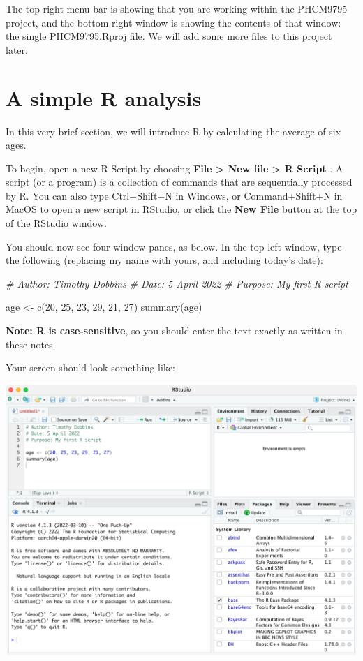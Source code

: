 \documentclass[
]{memoir}
\newenvironment{Shaded}{\begin{snugshade}}{\end{snugshade}}
\newcommand{\CommentTok}[1]{\textcolor[rgb]{0.56,0.35,0.01}{\textit{#1}}}
\newcommand{\DecValTok}[1]{\textcolor[rgb]{0.00,0.00,0.81}{#1}}
\newcommand{\FunctionTok}[1]{\textcolor[rgb]{0.00,0.00,0.00}{#1}}
\newcommand{\NormalTok}[1]{#1}
\newcommand{\OtherTok}[1]{\textcolor[rgb]{0.56,0.35,0.01}{#1}}
\begin{document}
The top-right menu bar is showing that you are working within the PHCM9795 project, and the bottom-right window is showing the contents of that window: the single PHCM9795.Rproj file. We will add some more files to this project later.

\hypertarget{simpleR}{%
\section{A simple R analysis}\label{simpleR}}

In this very brief section, we will introduce R by calculating the average of six ages.

To begin, open a new R Script by choosing \textbf{File \textgreater{} New file \textgreater{} R Script} . A script (or a program) is a collection of commands that are sequentially processed by R. You can also type Ctrl+Shift+N in Windows, or Command+Shift+N in MacOS to open a new script in RStudio, or click the \textbf{New File} button at the top of the RStudio window.

You should now see four window panes, as below. In the top-left window, type the following (replacing my name with yours, and including today's date):

\begin{Shaded}
\begin{Highlighting}[]
\CommentTok{\# Author: Timothy Dobbins}
\CommentTok{\# Date: 5 April 2022}
\CommentTok{\# Purpose: My first R script}

\NormalTok{age }\OtherTok{\textless{}{-}} \FunctionTok{c}\NormalTok{(}\DecValTok{20}\NormalTok{, }\DecValTok{25}\NormalTok{, }\DecValTok{23}\NormalTok{, }\DecValTok{29}\NormalTok{, }\DecValTok{21}\NormalTok{, }\DecValTok{27}\NormalTok{)}
\FunctionTok{summary}\NormalTok{(age)}
\end{Highlighting}
\end{Shaded}

\textbf{Note: R is case-sensitive}, so you should enter the text exactly as written in these notes.

Your screen should look something like:

\includegraphics[width=1\linewidth]{img/RStudio-screenshot-02}
\end{document}
